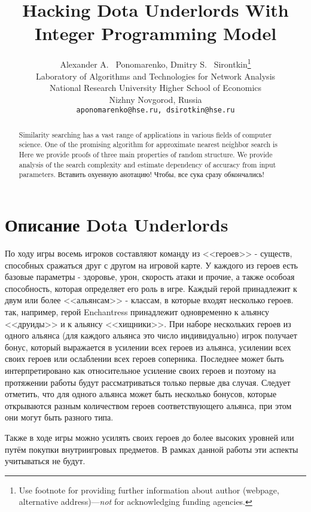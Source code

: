 \documentclass{article}
\title{Hacking Dota Underlords With Integer Programming Model}
\author{
  Alexander A. ~Ponomarenko, Dmitry S. ~Sirontkin\thanks{Use footnote for providing further
    information about author (webpage, alternative
    address)---\emph{not} for acknowledging funding agencies.} \\
  Laboratory of Algorithms and Technologies for Network Analysis\\
  National Research University Higher School of Economics \\
  Nizhny Novgorod, Russia\\
  \texttt{aponomarenko@hse.ru, dsirotkin@hse.ru} \\
}
\begin{document}
\maketitle

\begin{abstract}
Similarity searching has a vast range of applications in various fields of computer science. One of the promising algorithm for approximate nearest neighbor search is
Here we provide proofs of three main properties of random structure.
We provide analysis of the search complexity and estimate dependency of accuracy from input parameters. 
Вставить охуенную анотацию! Чтобы, все сука сразу обкончались!
\end{abstract}




\section{Описание Dota Underlords}

По ходу игры восемь игроков составляют команду из <<героев>> - существ, способных сражаться друг с другом на игровой карте. У каждого из героев есть базовые параметры - здоровье, урон, скорость атаки и прочие, а также особоая способность, которая определяет его роль в игре. Каждый герой принадлежит к двум или более <<альянсам>> - классам, в которые входят несколько героев. так, например, герой Enchantress принадлежит одновременно к альянсу <<друиды>> и к альянсу <<хищники>>. При наборе нескольких героев из одного альянса (для каждого альянса это число индивидуально) игрок получает бонус, который выражается в усилении всех героев из альянса, усилении всех своих героев или ослаблении всех героев соперника. Последнее может быть интерпретировано как относительное усиление своих героев и поэтому на протяжении работы будут рассматриваться только первые два случая. Следует отметить, что для одного альянса может быть несколько бонусов, которые открываются разным количеством героев соответствующего альянса, при этом они могут быть разного типа.

Также в ходе игры можно усилять своих героев до более высоких уровней или путём покупки внутриигровых предметов. В рамках данной работы эти аспекты учитываться не будут.
\end{document}
